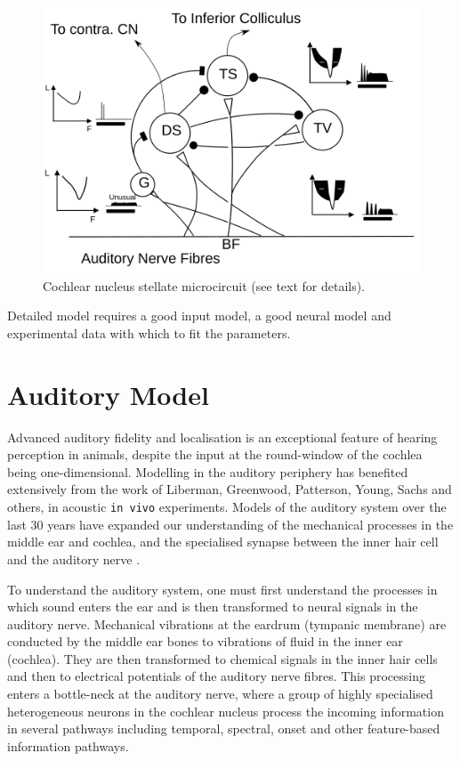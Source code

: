 \begin{figure}[htb]
  \centering
  \includegraphics[width=\textwidth]{gfx/CNcircuit}
  \caption{Cochlear nucleus stellate microcircuit (see text for details). }
  \label{fig:microcircuit}
\end{figure}

\medskip{}

Detailed model requires a good input model, a good neural model and
experimental data with which to fit the parameters.  

\section{Auditory Model}

Advanced auditory fidelity and localisation is an exceptional feature
of hearing perception in animals, despite the input at the
round-window of the cochlea being one-dimensional.  Modelling in the
auditory periphery has benefited extensively from the work of
Liberman, Greenwood, Patterson, Young, Sachs and others, in acoustic
\texttt{in vivo} experiments. Models of the auditory
system over the last 30 years have expanded our understanding of the
mechanical processes in the middle ear and cochlea, and the specialised
synapse between the inner hair cell and the auditory nerve
\citep{DavisVoigt:1991,Carney:1993,MeddisHewittEtAl:1990}.


To understand the auditory system, one
must first understand the processes in which sound enters the ear and is then
transformed to neural signals in the auditory nerve. Mechanical vibrations at
the eardrum (tympanic membrane) are conducted by the middle ear bones to vibrations of fluid in
the inner ear (cochlea). They are then transformed to chemical signals in the
inner hair cells and then to electrical potentials of the auditory nerve
fibres. This processing enters a bottle-neck at the auditory nerve, where a
group of highly specialised heterogeneous neurons in the cochlear nucleus
process the incoming information in several pathways including temporal,
spectral, onset and other feature-based information pathways.

